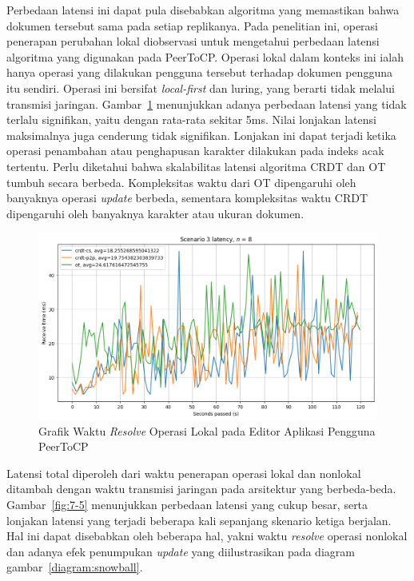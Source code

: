 Perbedaan latensi ini dapat pula disebabkan algoritma yang memastikan bahwa dokumen tersebut sama pada setiap replikanya. Pada penelitian ini, operasi penerapan perubahan lokal diobservasi untuk mengetahui perbedaan latensi algoritma yang digunakan pada PeerToCP. Operasi lokal dalam konteks ini ialah hanya operasi yang dilakukan pengguna tersebut terhadap dokumen pengguna itu sendiri. Operasi ini bersifat \textit{local-first} dan luring, yang berarti tidak melalui transmisi jaringan. Gambar~\ref{fig:12-5} menunjukkan adanya perbedaan latensi yang tidak terlalu signifikan, yaitu dengan rata-rata sekitar 5ms. Nilai lonjakan latensi maksimalnya juga cenderung tidak signifikan. Lonjakan ini dapat terjadi ketika operasi penambahan atau penghapusan karakter dilakukan pada indeks acak tertentu. Perlu diketahui bahwa skalabilitas latensi algoritma CRDT dan OT tumbuh secara berbeda. Kompleksitas waktu dari OT dipengaruhi oleh banyaknya operasi \textit{update} berbeda, sementara kompleksitas waktu CRDT dipengaruhi oleh banyaknya karakter atau ukuran dokumen.

\begin{figure}
 \centering
 \includegraphics[width=15cm]{./assets/skripsi/benchmark-vis_cell_12_output_5}
 \caption{Grafik Waktu \textit{Resolve} Operasi Lokal pada Editor Aplikasi Pengguna PeerToCP}
 \label{fig:12-5}
\end{figure}

Latensi total diperoleh dari waktu penerapan operasi lokal dan nonlokal ditambah dengan waktu transmisi jaringan pada arsitektur yang berbeda-beda. Gambar~\ref{fig:7-5} menunjukkan perbedaan latensi yang cukup besar, serta lonjakan latensi yang terjadi beberapa kali sepanjang skenario ketiga berjalan. Hal ini dapat disebabkan oleh beberapa hal, yakni waktu \textit{resolve} operasi nonlokal dan adanya efek penumpukan \textit{update} yang diilustrasikan pada diagram gambar~\ref{diagram:snowball}.

